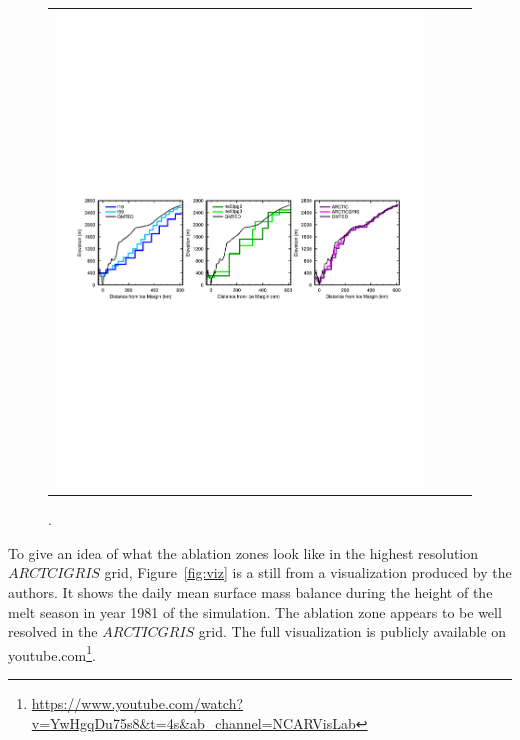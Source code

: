 \documentclass[draft]{agujournal2019}
\begin{document}
\begin{figure}[t]
\begin{center}
\begin{tabular}{cccc}
         \includegraphics[width=130mm]{figs/temp_btransect.pdf} \\
\end{tabular}
\end{center}
\caption{.}
\label{fig:ztrans}
\end{figure}

To give an idea of what the ablation zones look like in the highest resolution $ARCTCIGRIS$ grid, Figure~\ref{fig:viz} is a still from a visualization produced by the authors. It shows the daily mean surface mass balance during the height of the melt season in year 1981 of the simulation. The ablation zone appears to be well resolved in the $ARCTICGRIS$ grid. The full visualization is publicly available on youtube.com\footnote{\url{https://www.youtube.com/watch?v=YwHgqDu75s8&t=4s&ab_channel=NCARVisLab}}.
\end{document}
